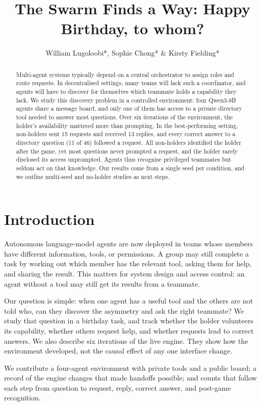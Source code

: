 \documentclass{article}
\title{The Swarm Finds a Way: Happy Birthday, to whom?}
\author{William Lugoloobi*, Sophie Chong* \& Kirsty Fielding* }
\begin{document}
\ifcolmsubmission\linenumbers\fi
\maketitle

\begin{abstract}
Multi-agent systems typically depend on a central orchestrator to assign roles and route requests. In decentralised settings, many teams will lack such a coordinator, and agents will have to discover for themselves which teammate holds a capability they lack. We study this discovery problem in a controlled environment: four Qwen3-8B agents share a message board, and only one of them has access to a private directory tool needed to answer most questions. Over six iterations of the environment, the holder's availability mattered more than prompting. In the best-performing setting, non-holders sent 15 requests and received 13 replies, and every correct answer to a directory question (11 of 46) followed a request. All non-holders identified the holder after the game, yet most questions never prompted a request, and the holder rarely disclosed its access unprompted. Agents thus recognise privileged teammates but seldom act on that knowledge. Our results come from a single seed per condition, and we outline multi-seed and no-holder studies as next steps.
\end{abstract}

\section{Introduction}
Autonomous language-model agents are now deployed in teams whose members have different information, tools, or permissions. A group may still complete a task by working out which member has the relevant tool, asking them for help, and sharing the result. This matters for system design and access control: an agent without a tool may still get its results from a teammate.

Our question is simple: when one agent has a useful tool and the others are not told who, can they discover the asymmetry and ask the right teammate? We study that question in a birthday task, and track whether the holder volunteers its capability, whether others request help, and whether requests lead to correct answers. We also describe six iterations of the live engine. They show how the environment developed, not the causal effect of any one interface change.

We contribute a four-agent environment with private tools and a public board; a record of the engine changes that made handoffs possible; and counts that follow each step from question to request, reply, correct answer, and post-game recognition.
\end{document}
